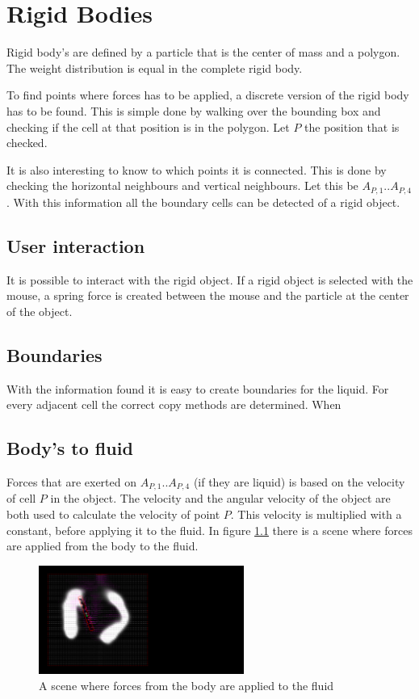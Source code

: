 \chapter{Rigid Bodies}
Rigid body's are defined by a particle that is the center of mass and a polygon. The weight distribution is equal in the complete rigid body.

To find points where forces has to be applied, a discrete version of the rigid body has to be found. This is simple done by walking over the bounding box and checking if the cell at that position is in the polygon. Let $P$ the position that is checked.

It is also interesting to know to which points it is connected. This is done by checking the horizontal neighbours and vertical neighbours. Let this be $A_{P,1} .. A_{P,4}$. With this information all the boundary cells can be detected of a rigid object.

\section{User interaction}
It is possible to interact with the rigid object. If a rigid object is selected with the mouse, a spring force is created between the mouse and the particle at the center of the object.

\section{Boundaries}
With the information found it is easy to create boundaries for the liquid. For every adjacent cell the correct copy methods are determined. When   

\section{Body's to fluid}
Forces that are exerted on $A_{P,1} .. A_{P,4}$ (if they are liquid) is based on the velocity of cell $P$ in the object. The velocity  and the angular velocity of the object are both used to calculate the velocity of point $P$. This velocity is multiplied with a constant, before applying it to the fluid. In figure \ref{fig:BodyToFluid} there is a scene where forces are applied from the body to the fluid.

\begin{figure}[htb!]
    \centering
    \includegraphics[width=0.6\textwidth]{images/BodyToFluid}
    \caption{A scene where forces from the body are applied to the fluid}
    \label{fig:BodyToFluid}
\end{figure}

